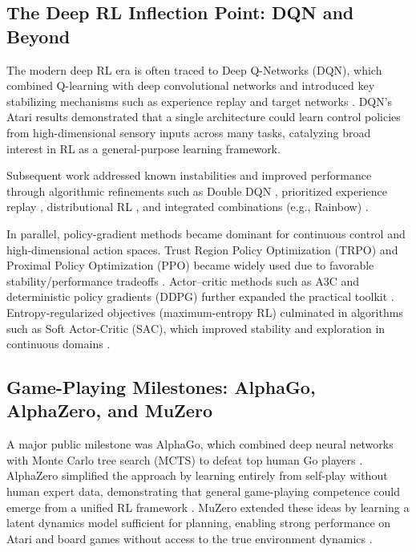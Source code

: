 \documentclass[unnumsec,webpdf,contemporary,large]{oup-authoring-template}
\theoremstyle{thmstyleone}
\theoremstyle{thmstyletwo}
\theoremstyle{thmstylethree}
\begin{document}
\subsection{The Deep RL Inflection Point: DQN and Beyond}

The modern deep RL era is often traced to Deep Q-Networks (DQN), which combined Q-learning with deep convolutional networks and introduced key stabilizing mechanisms such as experience replay and target networks \cite{mnih2015dqn}.
DQN's Atari results demonstrated that a single architecture could learn control policies from high-dimensional sensory inputs across many tasks, catalyzing broad interest in RL as a general-purpose learning framework.

Subsequent work addressed known instabilities and improved performance through algorithmic refinements such as Double DQN \cite{hasselt2016double},
prioritized experience replay \cite{schaul2016prioritized},
distributional RL \cite{bellemare2017distributional},
and integrated combinations (e.g., Rainbow) \cite{hessel2018rainbow}.

In parallel, policy-gradient methods became dominant for continuous control and high-dimensional action spaces.
Trust Region Policy Optimization (TRPO) and Proximal Policy Optimization (PPO) became widely used due to favorable stability/performance tradeoffs \cite{schulman2015trpo,schulman2017ppo}.
Actor--critic methods such as A3C and deterministic policy gradients (DDPG) further expanded the practical toolkit \cite{mnih2016a3c,lillicrap2016ddpg}.
Entropy-regularized objectives (maximum-entropy RL) culminated in algorithms such as Soft Actor-Critic (SAC), which improved stability and exploration in continuous domains \cite{haarnoja2018sac}.

\subsection{Game-Playing Milestones: AlphaGo, AlphaZero, and MuZero}

A major public milestone was AlphaGo, which combined deep neural networks with Monte Carlo tree search (MCTS) to defeat top human Go players \cite{silver2016alphago}.
AlphaZero simplified the approach by learning entirely from self-play without human expert data, demonstrating that general game-playing competence could emerge from a unified RL framework \cite{silver2017alphazero}.
MuZero extended these ideas by learning a latent dynamics model sufficient for planning, enabling strong performance on Atari and board games without access to the true environment dynamics \cite{schrittwieser2020muzero}.
\end{document}

